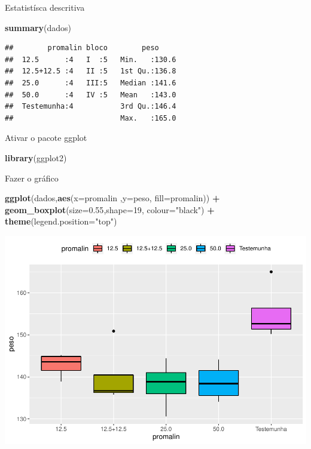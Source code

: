 \documentclass[
]{book}
\newenvironment{Shaded}{\begin{snugshade}}{\end{snugshade}}
\newcommand{\DataTypeTok}[1]{\textcolor[rgb]{0.13,0.29,0.53}{#1}}
\newcommand{\DecValTok}[1]{\textcolor[rgb]{0.00,0.00,0.81}{#1}}
\newcommand{\FloatTok}[1]{\textcolor[rgb]{0.00,0.00,0.81}{#1}}
\newcommand{\KeywordTok}[1]{\textcolor[rgb]{0.13,0.29,0.53}{\textbf{#1}}}
\newcommand{\NormalTok}[1]{#1}
\newcommand{\OperatorTok}[1]{\textcolor[rgb]{0.81,0.36,0.00}{\textbf{#1}}}
\newcommand{\StringTok}[1]{\textcolor[rgb]{0.31,0.60,0.02}{#1}}
\begin{document}
Estatistísca descritiva

\begin{Shaded}
\begin{Highlighting}[]
\KeywordTok{summary}\NormalTok{(dados)}
\end{Highlighting}
\end{Shaded}

\begin{verbatim}
##        promalin bloco        peso      
##  12.5      :4   I  :5   Min.   :130.6  
##  12.5+12.5 :4   II :5   1st Qu.:136.8  
##  25.0      :4   III:5   Median :141.6  
##  50.0      :4   IV :5   Mean   :143.0  
##  Testemunha:4           3rd Qu.:146.4  
##                         Max.   :165.0
\end{verbatim}

Ativar o pacote ggplot

\begin{Shaded}
\begin{Highlighting}[]
\KeywordTok{library}\NormalTok{(ggplot2)}
\end{Highlighting}
\end{Shaded}

Fazer o gráfico

\begin{Shaded}
\begin{Highlighting}[]
\KeywordTok{ggplot}\NormalTok{(dados,}\KeywordTok{aes}\NormalTok{(}\DataTypeTok{x=}\NormalTok{promalin ,}\DataTypeTok{y=}\NormalTok{peso, }\DataTypeTok{fill=}\NormalTok{promalin)) }\OperatorTok{+}\StringTok{ }
\StringTok{      }\KeywordTok{geom_boxplot}\NormalTok{(}\DataTypeTok{size=}\FloatTok{0.55}\NormalTok{,}\DataTypeTok{shape=}\DecValTok{19}\NormalTok{, }\DataTypeTok{colour=}\StringTok{"black"}\NormalTok{) }\OperatorTok{+}\StringTok{ }
\StringTok{      }\KeywordTok{theme}\NormalTok{(}\DataTypeTok{legend.position=}\StringTok{"top"}\NormalTok{) }
\end{Highlighting}
\end{Shaded}

\includegraphics{TudodoR_files/figure-latex/unnamed-chunk-232-1.pdf}
\end{document}
